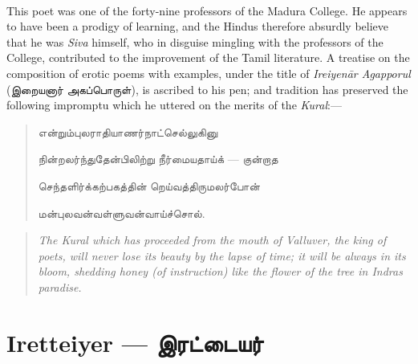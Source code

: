\documentclass{article}
\newcommand{\TamilText}[1]{\texttamil{#1}}
\newcommand{\TamilBold}[1]{\texttamil{\textbf{#1}}}
\newcommand{\tam}[1]{\TamilText{#1}}
\newcommand{\tambold}[1]{\TamilBold{#1}}
\begin{document}
\paragraph{}
This poet was one of the forty-nine professors of the Madura College. He appears to have been a prodigy of learning, and the Hindus therefore absurdly believe that he was \emph{Siva} himself, who in disguise mingling with the professors of the College, contributed to the improvement of the Tamil literature. A treatise on the composition of erotic poems with examples, under the title of \emph{Ireiyen\={a}r Agapporul} (\tam{இறையனார் அகப்பொருள்}), is ascribed to his pen; and tradition has preserved the following impromptu which he uttered on the merits of the \emph{Kural}:---
\begin{quotation}\small
\tam{என்றும்புலராதியாணர்நாட்‌செல்லுகினு}

\tam{நின்றலர்ந்துதேன்‌பிலிற்று நீர்மையதாய்க்} --- \tam{குன்றாத}

\tam{செந்தளிர்க்கற்பகத்தின்‌ றெய்வத்திருமலர்போன்‌}

\tam{மன்புலவன்வள்ளுவன்வாய்ச்சொல்‌}.
\end{quotation}
\begin{quotation}\small
\emph{The Kural which has proceeded from the mouth of Valluver, the king of poets, will never lose its beauty by the lapse of time; it will be always in its bloom, shedding honey (of instruction) like the flower of the tree in Indras paradise.}
\end{quotation}

\section{Iretteiyer --- \tambold{இரட்டையர்}}
\end{document}
